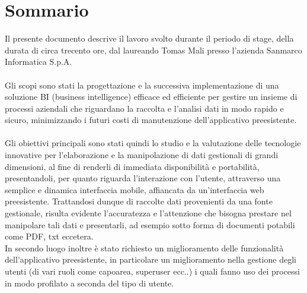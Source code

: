 
\cleardoublepage
{}
{}
\begingroup
\let\clearpage\relax
\let\cleardoublepage\relax
\let\cleardoublepage\relax

\chapter*{Sommario}

Il presente documento descrive il lavoro svolto durante il periodo di stage, della durata di circa trecento ore, dal laureando Tomas Mali presso l'azienda Sanmarco Informatica S.p.A.\\ \\

Gli scopi sono stati la progettazione e la successiva implementazione di una soluzione BI (business intelligence) efficace ed efficiente per gestire un insieme di processi aziendali che riguardano la raccolta e l'analisi dati in modo rapido e sicuro, minimizzando i futuri costi di manutenzione dell'applicativo preesistente.\\\\

Gli obiettivi principali sono stati quindi lo studio e la valutazione delle tecnologie innovative  per l'elaborazione e la manipolazione di dati gestionali di grandi dimensioni, al fine di renderli di immediata disponibilità e portabilità, presentandoli, per quanto riguarda l'interazione con l'utente, attraverso una semplice e dinamica interfaccia mobile, affiancata da un'interfaccia web preesistente. Trattandosi dunque di raccolte dati provenienti da una fonte gestionale, risulta evidente l'accuratezza e l'attenzione  che bisogna prestare nel manipolare tali dati e presentarli, ad esempio sotto forma di documenti potabili come PDF, txt eccetera.\\ 
In secondo luogo inoltre è stato richiesto un miglioramento delle funzionalità dell'applicativo preesistente, in particolare un miglioramento nella gestione degli utenti (di vari ruoli come capoarea, superuser ecc..) i quali fanno uso dei processi  in modo profilato a seconda del tipo di utente.

%
%

\endgroup			

\vfill


